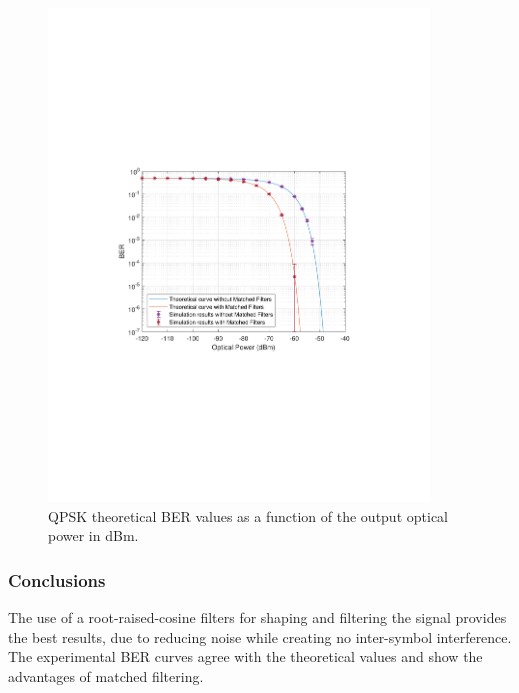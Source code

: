 \begin{refsection}
\begin{figure}[H]
	\centering
		\includegraphics[clip, trim=4cm 8cm 4cm 8cm, width=0.9\textwidth]{./sdf/m_qam_system/figures/teor_vs_simul.pdf}
\caption{QPSK theoretical BER values as a function of the output optical power in dBm.\label{fig:ber_pseudorandom}}
\end{figure}


\subsubsection*{Conclusions}
The use of a root-raised-cosine filters for shaping and filtering the signal provides the best results, due to reducing noise while creating no inter-symbol interference. The experimental BER curves agree with the theoretical values and show the advantages of matched filtering.


\end{refsection}
